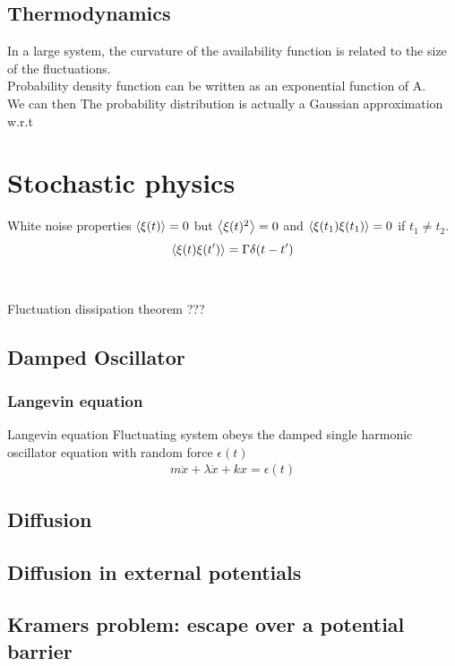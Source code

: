 \documentclass[12pt,a4paper]{article}
\begin{document}
\subsection{Thermodynamics}
In a large system, the curvature of the availability function is related to the size of the fluctuations.\\
Probability density function can be written as an exponential function of A.\\
We can then 
The probability distribution is actually a Gaussian approximation w.r.t
\section{Stochastic physics}
    \begin{theorem}
        {White noise properties}{
        $\expval{\xi(t)}=0$ but $\expval{\xi(t)^2}=0$ and  $\expval{\xi(t_1)\xi(t_1)}=0$ if $t_1\neq t_2$.
        \begin{equation*}
            \expval{\xi(t)\xi(t')}=\Gamma\delta(t-t')
        \end{equation*}
        }
    \end{theorem}
    \\
    \begin{theorem}
        {Fluctuation dissipation theorem}{
        ???
        }
    \end{theorem}
    \subsection{Damped Oscillator}
        \subsubsection{Langevin equation}
            \begin{theorem}{Langevin equation}
                {
                Fluctuating system obeys the damped single harmonic oscillator equation with random force $\epsilon(t)$
                \begin{align*}
                    m\ddot{x}+\lambda\dot{x}+kx=\epsilon(t)
                \end{align*}
                }
            \end{theorem}
    \subsection{Diffusion}
    \subsection{Diffusion in external potentials}
    \subsection{Kramers problem: escape over a potential barrier}
\end{document}
